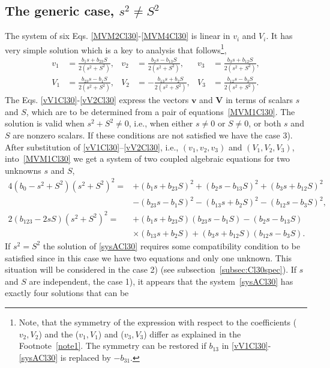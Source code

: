 \documentclass{birkjour}
\newcommand{\bv}{\ensuremath{\mathbf{v}}}
\newcommand{\bV}{\ensuremath{\mathbf{V}}}
\begin{document}
\subsection{The generic case, $s^2 \neq S^2$}
The system of six Eqs. \eqref{MVM2Cl30}-\eqref{MVM4Cl30} is linear
in $v_i$ and $V_i$. It has  very simple solution which is a key to
analysis that follows\footnote{Note, that the symmetry of the
expression with respect to the coefficients  ($v_2,V_2$) and the
($v_1,V_1$) and ($v_3,V_3$) differ as explained in the
Footnote~\ref{note1}. The symmetry can be restored if $b_{13}$ in
\eqref{vV1Cl30}-\eqref{sysACl30} is replaced by $-b_{31}$.},
\begin{align}
v_1&=\frac{b_1s+b_{23}S}{2(s^2+S^2)},
 &v_2&=\frac{b_{2}s-b_{13}S}{2(s^2+S^2)},
  &v_3&=\frac{b_3s+b_{12}S}{2(s^2+S^2)}, \label{vV1Cl30} \\
V_1&=\frac{b_{23}s-b_{1}S}{2(s^2+S^2)},
&V_2&=-\frac{b_{13}s+b_{2}S}{2(s^2+S^2)},
&V_3&=\frac{b_{12}s-b_{3}S}{2(s^2+S^2)}.\label{vV2Cl30}
\end{align}
The Eqs. \eqref{vV1Cl30}-\eqref{vV2Cl30} express the vectors $\bv$
and $\bV$ in terms of scalars $s$ and $S$, which are to be
determined from a pair of equations~\eqref{MVM1Cl30}. The
solution is valid when $s^2+S^2\neq 0$, i.e., when either $s\neq 0$
or $S\neq 0$, or both $s$ and $S$ are nonzero scalars. If these
conditions are not satisfied we have the case 3).  After
substitution of \eqref{vV1Cl30}--\eqref{vV2Cl30}, i.e.,
$(v_1,v_2,v_3)$ and $(V_1,V_2,V_3)$, into~\eqref{MVM1Cl30} we get
a system of two coupled algebraic equations for two unknowns $s$
and $S$,
\begin{equation}\begin{split}\label{sysACl30}
4(b_0-s^2+S^2)(s^2+S^2)^2=&+(b_1s+b_{23}S)^2+(b_2s-b_{13}S)^2+(b_3s+b_{12}S)^2\\
  &-(b_{23}s-b_1S)^2-(b_{13}s+b_2S)^2-(b_{12}s-b_3S)^2,\\
  2(b_{123}-2sS)(s^2+S^2)^2=&+(b_1s+b_{23}S)(b_{23}s-b_{1}S)-(b_{2}s-b_{13}S)\\
&\times(b_{13}s+b_{2}S)+(b_3s+b_{12}S)(b_{12}s-b_3S).
 \end{split}\end{equation}
If $s^2=S^2$ the solution of \eqref{sysACl30} requires some
compatibility condition to be satisfied since in this case we have
two equations and only one unknown. This situation will be
considered in the case 2) (see subsection~\ref{subsec:Cl30spec}). If $s$
and $S$ are independent, the case 1), it appears that
the system~\eqref{sysACl30} has exactly four solutions that can be
\end{document}
